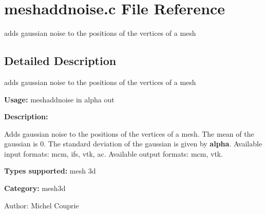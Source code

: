 \section{meshaddnoise.c File Reference}
\label{meshaddnoise_8c}
adds gaussian noise to the positions of the vertices of a mesh 



\subsection{Detailed Description}
adds gaussian noise to the positions of the vertices of a mesh 

{\bf Usage:} meshaddnoise in alpha out

{\bf Description:}

Adds gaussian noise to the positions of the vertices of a mesh. The mean of the gaussian is 0. The standard deviation of the gaussian is given by {\bf alpha}. Available input formats: mcm, ifs, vtk, ac. Available output formats: mcm, vtk.

{\bf Types supported:} mesh 3d

{\bf Category:} mesh3d

\begin{Desc}
\item[Author:]Michel Couprie \end{Desc}
